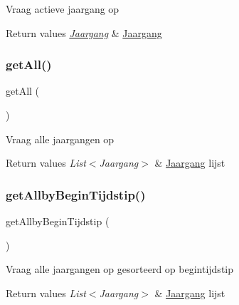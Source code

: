 Vraag actieve jaargang op 
\begin{DoxyRetVals}{Return values}
{\em \mbox{\hyperlink{class_jaargang}{Jaargang}}} & \mbox{\hyperlink{class_jaargang}{Jaargang}} \\
\hline
\end{DoxyRetVals}
\mbox{\label{class_jaargang__model_aba0d5b303383fb5b1fabb5fd01cd3800}} 
\subsubsection{\texorpdfstring{get\+All()}{getAll()}}
{\footnotesize\ttfamily get\+All (\begin{DoxyParamCaption}{ }\end{DoxyParamCaption})}

Vraag alle jaargangen op 
\begin{DoxyRetVals}{Return values}
{\em List$<$\+Jaargang$>$} & \mbox{\hyperlink{class_jaargang}{Jaargang}} lijst \\
\hline
\end{DoxyRetVals}
\mbox{\label{class_jaargang__model_a6e4ef32a886b1cb2774da0b879ac49cd}} 
\subsubsection{\texorpdfstring{get\+Allby\+Begin\+Tijdstip()}{getAllbyBeginTijdstip()}}
{\footnotesize\ttfamily get\+Allby\+Begin\+Tijdstip (\begin{DoxyParamCaption}{ }\end{DoxyParamCaption})}

Vraag alle jaargangen op gesorteerd op begintijdstip 
\begin{DoxyRetVals}{Return values}
{\em List$<$\+Jaargang$>$} & \mbox{\hyperlink{class_jaargang}{Jaargang}} lijst \\
\hline
\end{DoxyRetVals}
\mbox{\label{class_jaargang__model_a55976d021ef90b90b080cd7daa1e318f}} 
